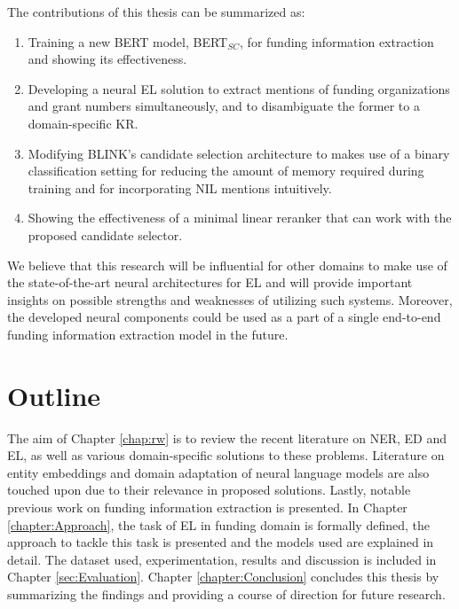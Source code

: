 \documentclass{report}
\theoremstyle{definition}
\theoremstyle{remark}
\begin{document}
The contributions of this thesis can be summarized as:
\renewcommand{\labelenumi}{\arabic{enumi}.} 
\begin{enumerate}
    \item Training a new BERT model, BERT$_{SC}$, for funding information extraction and showing its effectiveness.
    \item Developing a neural EL solution to extract mentions of funding organizations and grant numbers simultaneously, and to disambiguate the former to a domain-specific KR. 
    \item Modifying BLINK's candidate selection architecture to makes use of a binary classification setting for reducing the amount of memory required during training and for incorporating NIL mentions intuitively.
    \item Showing the effectiveness of a minimal linear reranker that can work with the proposed candidate selector.
\end{enumerate}

We believe that this research will be influential for other domains to make use of the state-of-the-art neural architectures for EL and will provide important insights on possible strengths and weaknesses of utilizing such systems. Moreover, the developed neural components could be used as a part of a single end-to-end funding information extraction model in the future.

\section{Outline}
The aim of Chapter \ref{chap:rw} is to review the recent literature on NER, ED and EL, as well as various domain-specific solutions to these problems. Literature on entity embeddings and domain adaptation of neural language models are also touched upon due to their relevance in proposed solutions. Lastly, notable previous work on funding information extraction is presented. In Chapter \ref{chapter:Approach}, the task of EL in funding domain is formally defined, the approach to tackle this task is presented and the models used are explained in detail. The dataset used, experimentation, results and discussion is included in Chapter \ref{sec:Evaluation}. Chapter \ref{chapter:Conclusion} concludes this thesis by summarizing the findings and providing a course of direction for future research.
\end{document}
